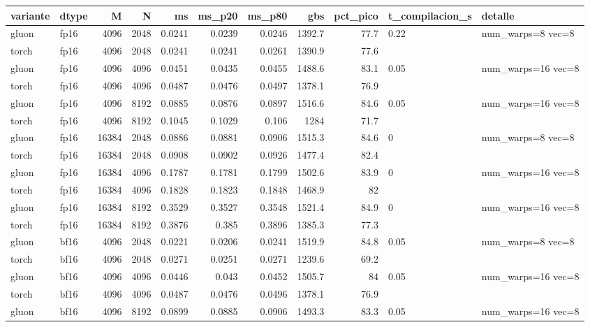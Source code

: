 \begin{table}[htbp]
  \centering\small
  \begin{tabular}{llrrrrrrrll}
    \toprule
    variante & dtype & M & N & ms & ms\_p20 & ms\_p80 & gbs & pct\_pico & t\_compilacion\_s & detalle \\
    \midrule
    gluon & fp16 & 4096 & 2048 & 0.0241 & 0.0239 & 0.0246 & 1392.7 & 77.7 & 0.22 & num\_warps=8 vec=8 \\
    torch & fp16 & 4096 & 2048 & 0.0241 & 0.0241 & 0.0261 & 1390.9 & 77.6 &  &  \\
    gluon & fp16 & 4096 & 4096 & 0.0451 & 0.0435 & 0.0455 & 1488.6 & 83.1 & 0.05 & num\_warps=16 vec=8 \\
    torch & fp16 & 4096 & 4096 & 0.0487 & 0.0476 & 0.0497 & 1378.1 & 76.9 &  &  \\
    gluon & fp16 & 4096 & 8192 & 0.0885 & 0.0876 & 0.0897 & 1516.6 & 84.6 & 0.05 & num\_warps=16 vec=8 \\
    torch & fp16 & 4096 & 8192 & 0.1045 & 0.1029 & 0.106 & 1284 & 71.7 &  &  \\
    gluon & fp16 & 16384 & 2048 & 0.0886 & 0.0881 & 0.0906 & 1515.3 & 84.6 & 0 & num\_warps=8 vec=8 \\
    torch & fp16 & 16384 & 2048 & 0.0908 & 0.0902 & 0.0926 & 1477.4 & 82.4 &  &  \\
    gluon & fp16 & 16384 & 4096 & 0.1787 & 0.1781 & 0.1799 & 1502.6 & 83.9 & 0 & num\_warps=16 vec=8 \\
    torch & fp16 & 16384 & 4096 & 0.1828 & 0.1823 & 0.1848 & 1468.9 & 82 &  &  \\
    gluon & fp16 & 16384 & 8192 & 0.3529 & 0.3527 & 0.3548 & 1521.4 & 84.9 & 0 & num\_warps=16 vec=8 \\
    torch & fp16 & 16384 & 8192 & 0.3876 & 0.385 & 0.3896 & 1385.3 & 77.3 &  &  \\
    gluon & bf16 & 4096 & 2048 & 0.0221 & 0.0206 & 0.0241 & 1519.9 & 84.8 & 0.05 & num\_warps=8 vec=8 \\
    torch & bf16 & 4096 & 2048 & 0.0271 & 0.0251 & 0.0271 & 1239.6 & 69.2 &  &  \\
    gluon & bf16 & 4096 & 4096 & 0.0446 & 0.043 & 0.0452 & 1505.7 & 84 & 0.05 & num\_warps=16 vec=8 \\
    torch & bf16 & 4096 & 4096 & 0.0487 & 0.0476 & 0.0496 & 1378.1 & 76.9 &  &  \\
    gluon & bf16 & 4096 & 8192 & 0.0899 & 0.0885 & 0.0906 & 1493.3 & 83.3 & 0.05 & num\_warps=16 vec=8 \\

\end{tabular}
\end{table}
